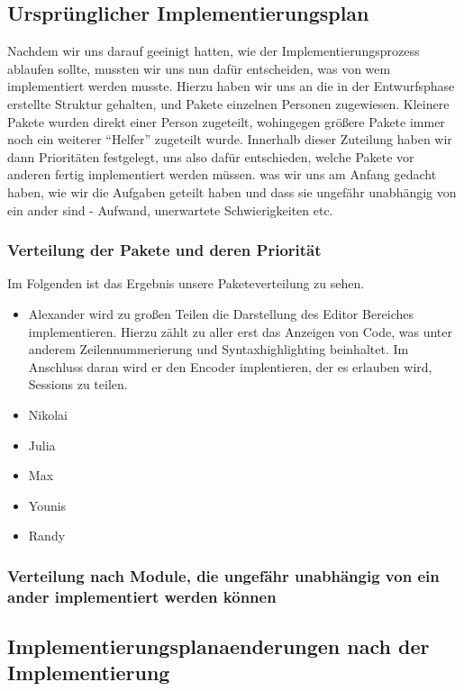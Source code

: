 \documentclass[parskip=full,11pt,twoside]{scrartcl}
\begin{document}
\subsection{Ursprünglicher Implementierungsplan}
Nachdem wir uns darauf geeinigt hatten, wie der Implementierungsprozess ablaufen sollte, mussten wir uns nun dafür entscheiden, was von wem implementiert werden musste.
Hierzu haben wir uns an die in der Entwurfsphase erstellte Struktur gehalten, und Pakete einzelnen Personen zugewiesen.
Kleinere Pakete wurden direkt einer Person zugeteilt, wohingegen größere Pakete immer noch ein weiterer \enquote{Helfer} zugeteilt wurde.
Innerhalb dieser Zuteilung haben wir dann Prioritäten festgelegt, uns also dafür entschieden, welche Pakete vor anderen fertig implementiert werden müssen.
\newline
was wir uns am Anfang gedacht haben, wie wir die Aufgaben geteilt haben und dass sie ungefähr unabhängig von ein ander sind - Aufwand, unerwartete Schwierigkeiten etc.

\subsubsection{Verteilung der Pakete und deren Priorität}
Im Folgenden ist das Ergebnis unsere Paketeverteilung zu sehen.
\begin{itemize}
    \item Alexander
        \newline
        wird zu großen Teilen die Darstellung des Editor Bereiches implementieren. 
        Hierzu zählt zu aller erst das Anzeigen von Code, was unter anderem Zeilennummerierung und Syntaxhighlighting beinhaltet.
        Im Anschluss daran wird er den Encoder implentieren, der es erlauben wird, Sessions zu teilen.
    \item Nikolai
    \item Julia
    \item Max
    \item Younis
    \item Randy
\end{itemize}


\subsubsection{Verteilung nach Module, die ungefähr unabhängig von ein ander implementiert werden können}
\subsection{Implementierungsplanaenderungen nach der Implementierung}
\end{document}
